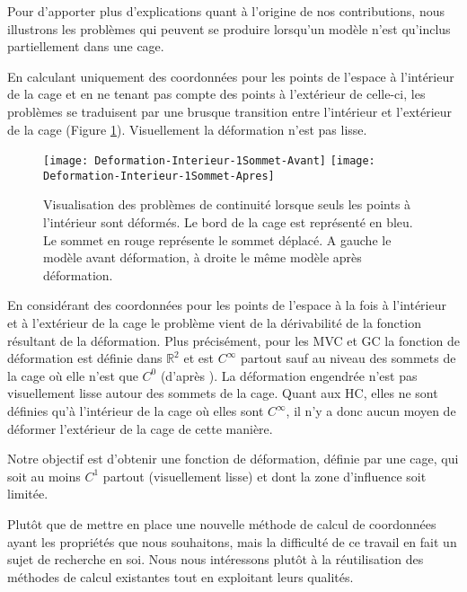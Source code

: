 Pour d'apporter plus d'explications quant à l'origine de nos contributions,
nous illustrons les problèmes qui peuvent se produire lorsqu'un modèle n'est
qu'inclus partiellement dans une cage.

En calculant uniquement des coordonnées pour les points de l'espace à
l'intérieur de la cage et en ne tenant pas compte des points à l'extérieur de
celle-ci, les problèmes se traduisent par une brusque transition entre
l'intérieur et l'extérieur de la cage (Figure \ref{MELVI}). Visuellement la
déformation n'est pas lisse.

\begin{figure}[ht]
  \begin{center}
    \scalebox{0.2}
    {
      \texttt{[image: Deformation-Interieur-1Sommet-Avant]}
      \texttt{[image: Deformation-Interieur-1Sommet-Apres]}
    }

    \caption[Problème de continuité déformation naïve] {Visualisation des
problèmes de continuité lorsque seuls les points à l'intérieur sont déformés.
Le bord de la cage est représenté en bleu. Le sommet en rouge représente le
sommet déplacé. A gauche le modèle avant déformation, à droite le même modèle
après déformation.}

    \label{MELVI}
  \end{center}
\end{figure}

En considérant des coordonnées pour les points de l'espace à la fois à
l'intérieur et à l'extérieur de la cage le problème vient de la dérivabilité
de la fonction résultant de la déformation. Plus précisément, pour les MVC et
GC la fonction de déformation est définie dans $\mathbb{R}^2$ et est
$C^{\infty}$ partout sauf au niveau des sommets de la cage où elle n'est que
$C^0$ (d'après \cite{LS08}). La déformation engendrée n'est pas visuellement lisse autour des
sommets de la cage. Quant aux HC, elles ne sont définies qu'à l'intérieur de
la cage où elles sont $C^{\infty}$, il n'y a donc aucun moyen de déformer
l'extérieur de la cage de cette manière.

Notre objectif est d'obtenir une fonction de déformation, définie par une
cage, qui soit au moins $C^1$ partout (visuellement lisse) et dont la zone
d'influence soit limitée.

Plutôt que de mettre en place une nouvelle méthode de calcul de coordonnées
ayant les propriétés que nous souhaitons, mais la difficulté de ce travail en
fait un sujet de recherche en soi. Nous nous intéressons plutôt à la
réutilisation des méthodes de calcul existantes tout en exploitant leurs
qualités.

